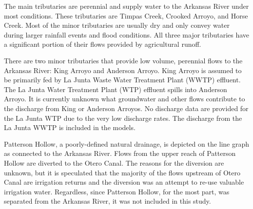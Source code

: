 \begin{linenumbers}[1]

The main tributaries are perennial and supply water to the Arkansas River under most conditions.  These tributaries are Timpas Creek, Crooked Arroyo, and Horse Creek.  Most of the minor tributaries are usually dry and only convey water during larger rainfall events and flood conditions.  All three major tributaries have a significant portion of their flows provided by agricultural runoff.

There are two minor tributaries that provide low volume, perennial flows to the Arkansas River: King Arroyo and Anderson Arroyo.  King Arroyo is assumed to be primarily fed by La Junta Waste Water Treatment Plant (WWTP) effluent.  The La Junta Water Treatment Plant (WTP) effluent spills into Anderson Arroyo.  It is currently unknown what groundwater and other flows contribute to the discharge from King or Anderson Arroyos.  No discharge data are provided for the La Junta WTP due to the very low discharge rates.  The discharge from the La Junta WWTP is included in the models.  

Patterson Hollow, a poorly-defined natural drainage, is depicted on the line graph as connected to the Arkansas River.  Flows from the upper reach of Patterson Hollow are diverted to the Otero Canal.  The reasons for the diversion are unknown, but it is speculated that the majority of the flows upstream of Otero Canal are irrigation returns and the diversion was an attempt to re-use valuable irrigation water.  Regardless, since Patterson Hollow, for the most part, was separated from the Arkansas River, it was not included in this study.


\end{linenumbers}
